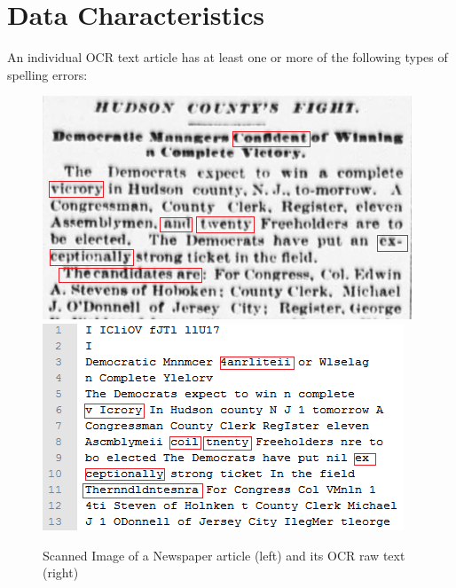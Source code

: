 \documentclass[letterpaper,11pt]{report}
\begin{document}
\section{Data Characteristics}
An individual OCR text article has at least one or more of the following types of spelling errors:

\begin{figure}[hbt]
\includegraphics[scale=0.75]{originalimage}
\includegraphics[scale=0.80]{ocr}
\caption{Scanned Image of a Newspaper article (left) and its OCR raw text (right)}
\end{figure}
\end{document}
